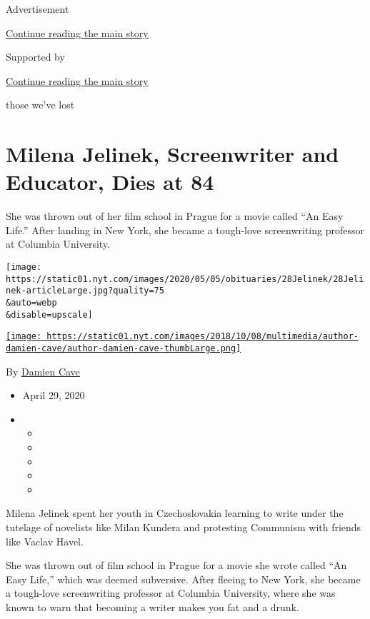 Advertisement

\protect\hyperlink{after-top}{Continue reading the main story}

Supported by

\protect\hyperlink{after-sponsor}{Continue reading the main story}

those we've lost

\hypertarget{milena-jelinek-screenwriter-and-educator-dies-at-84}{%
\section{Milena Jelinek, Screenwriter and Educator, Dies at
84}\label{milena-jelinek-screenwriter-and-educator-dies-at-84}}

She was thrown out of her film school in Prague for a movie called ``An
Easy Life.'' After landing in New York, she became a tough-love
screenwriting professor at Columbia University.

\texttt{[image: https://static01.nyt.com/images/2020/05/05/obituaries/28Jelinek/28Jelinek-articleLarge.jpg?quality=75\\\&auto=webp\\\&disable=upscale]}

\href{https://www.nytimes.com/by/damien-cave}{\texttt{[image: https://static01.nyt.com/images/2018/10/08/multimedia/author-damien-cave/author-damien-cave-thumbLarge.png]}}

By \href{https://www.nytimes.com/by/damien-cave}{Damien Cave}

\begin{itemize}
\item
  April 29, 2020
\item
  \begin{itemize}
  \item
  \item
  \item
  \item
  \item
  \end{itemize}
\end{itemize}

Milena Jelinek spent her youth in Czechoslovakia learning to write under
the tutelage of novelists like Milan Kundera and protesting Communism
with friends like Vaclav Havel.

She was thrown out of film school in Prague for a movie she wrote called
``An Easy Life,'' which was deemed subversive. After fleeing to New
York, she became a tough-love screenwriting professor at Columbia
University, where she was known to warn that becoming a writer makes you
fat and a drunk.

